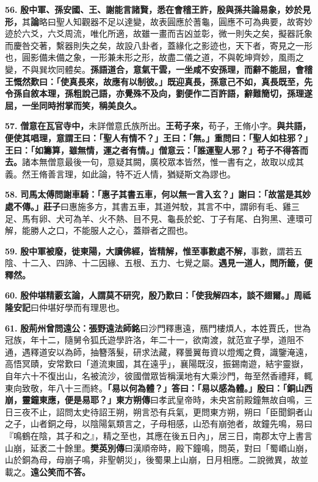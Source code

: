 \textbf{56.} \textbf{殷中軍、孫安國、王、謝能言諸賢，悉在會稽王許，殷與孫共論易象，妙於見形，}{\footnotesize 其\textbf{論}略曰聖人知觀器不足以達變，故表圓應於蓍龜，圓應不可為典要，故寄妙迹於六爻，六爻周流，唯化所適，故雖一畫而吉凶並彰，微一則失之矣，擬器託象而慶咎交著，繫器則失之矣，故設八卦者，蓋緣化之影迹也，天下者，寄見之一形也，圓影備未備之象，一形兼未形之形，故盡二儀之道，不與乾坤齊妙，風雨之變，不與巽坎同體矣。}\textbf{孫語道合，意氣干雲，一坐咸不安孫理，而辭不能屈，會稽王慨然歎曰：「使真長來，故應有以制彼。」既迎真長，孫意己不如，真長既至，先令孫自敘本理，孫粗說己語，亦覺殊不及向，劉便作二百許語，辭難簡切，孫理遂屈，一坐同時拊掌而笑，稱美良久。}

\textbf{57.} \textbf{僧意在瓦官寺中，}{\footnotesize 未詳僧意氏族所出。}\textbf{王苟子來，}{\footnotesize 苟子，王脩小字。}\textbf{與共語，便使其唱理，意謂王曰：「聖人有情不？」王曰：「無。」重問曰：「聖人如柱邪？」王曰：「如籌算，雖無情，運之者有情。」僧意云：「誰運聖人邪？」苟子不得答而去。}{\footnotesize 諸本無僧意最後一句，意疑其闕，廣校眾本皆然，惟一書有之，故取以成其義。然王脩善言理，如此論，特不近人情，猶疑斯文為謬也。}

\textbf{58.} \textbf{司馬太傅問謝車騎：「惠子其書五車，何以無一言入玄？」謝曰：「故當是其妙處不傳。」}{\footnotesize \textbf{莊子}曰惠施多方，其書五車，其道舛駮，其言不中，謂卵有毛、雞三足、馬有卵、犬可為羊、火不熱、目不見、龜長於蛇、丁子有尾、白狗黑、連環可解，能勝人之口，不能服人之心，蓋辯者之囿也。}

\textbf{59.} \textbf{殷中軍被廢，徙東陽，大讀佛經，皆精解，惟至事數處不解，}{\footnotesize 事數，謂若五陰、十二入、四諦、十二因緣、五根、五力、七覺之屬。}\textbf{遇見一道人，問所籤，便釋然。}

\textbf{60.} \textbf{殷仲堪精覈玄論，人謂莫不研究，殷乃歎曰：「使我解四本，談不翅爾。」}{\footnotesize \textbf{周祗隆安記}曰仲堪好學而有理思也。}

\textbf{61.} \textbf{殷荊州曾問遠公：}{\footnotesize \textbf{張野遠法師銘}曰沙門釋惠遠，鴈門樓煩人，本姓賈氏，世為冠族，年十二，隨舅令狐氏遊學許洛，年二十一，欲南渡，就范宣子學，道阻不通，遇釋道安以為師，抽簪落髮，研求法藏，釋曇翼毎資以燈燭之費，識鑒淹遠，高悟冥賾，安常歎曰「道流東國，其在遠乎」，襄陽既沒，振錫南遊，結宇靈嶽，自年六十不復出山，名被流沙，彼國僧眾皆稱漢地有大乘沙門，毎至然香禮拜，輒東向致敬，年八十三而終。}\textbf{「易以何為體？」答曰：「易以感為體。」殷曰：「銅山西崩，靈鐘東應，便是易耶？」}{\footnotesize \textbf{東方朔傳}曰孝武皇帝時，未央宮前殿鐘無故自鳴，三日三夜不止，詔問太史待詔王朔，朔言恐有兵氣，更問東方朔，朔曰「臣聞銅者山之子，山者銅之母，以陰陽氣類言之，子母相感，山恐有崩弛者，故鐘先鳴，易曰『鳴鶴在陰，其子和之』，精之至也，其應在後五日內」，居三日，南郡太守上書言山崩，延袤二十餘里。\textbf{樊英別傳}曰漢順帝時，殿下鐘鳴，問英，對曰「蜀㟭山崩，山於銅為母，母崩子鳴，非聖朝災」，後蜀果上山崩，日月相應。二說微異，故並載之。}\textbf{遠公笑而不答。}

